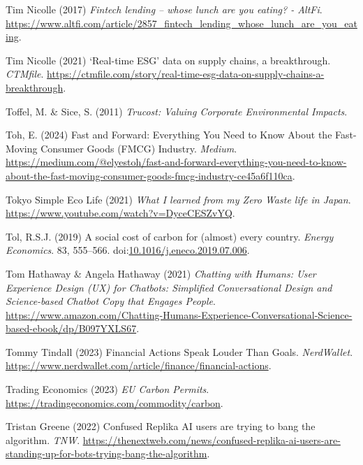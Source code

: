 \documentclass[
  letterpaper,
  DIV=11,
  numbers=noendperiod]{scrartcl}
\newlength{\cslhangindent}
\newenvironment{CSLReferences}[2] %
 {\begin{list}{}{%
  \setlength{\itemindent}{0pt}
  \setlength{\leftmargin}{0pt}
  \setlength{\parsep}{0pt}
  \ifodd #1
   \setlength{\leftmargin}{\cslhangindent}
   \setlength{\itemindent}{-1\cslhangindent}
  \fi
  \setlength{\itemsep}{#2\baselineskip}}}
 {\end{list}}
\begin{document}
\begin{CSLReferences}{0}{1}
Tim Nicolle (2017) \emph{Fintech lending -- whose lunch are you eating?
- {AltFi}}.
\url{https://www.altfi.com/article/2857_fintech_lending_whose_lunch_are_you_eating}.

Tim Nicolle (2021) {`{Real-time ESG}'} data on supply chains, a
breakthrough. \emph{CTMfile}.
\url{https://ctmfile.com/story/real-time-esg-data-on-supply-chains-a-breakthrough}.

Toffel, M. \& Sice, S. (2011) \emph{Trucost: {Valuing Corporate
Environmental Impacts}}.

Toh, E. (2024) Fast and {Forward}: {Everything You Need} to {Know About}
the {Fast-Moving Consumer Goods} ({FMCG}) {Industry}. \emph{Medium}.
\url{https://medium.com/@elyestoh/fast-and-forward-everything-you-need-to-know-about-the-fast-moving-consumer-goods-fmcg-industry-ce45a6f110ca}.

Tokyo Simple Eco Life (2021) \emph{What {I} learned from my {Zero Waste}
life in {Japan}}. \url{https://www.youtube.com/watch?v=DyceCESZvYQ}.

Tol, R.S.J. (2019) A social cost of carbon for (almost) every country.
\emph{Energy Economics}. 83, 555--566.
doi:\href{https://doi.org/10.1016/j.eneco.2019.07.006}{10.1016/j.eneco.2019.07.006}.

Tom Hathaway \& Angela Hathaway (2021) \emph{Chatting with {Humans}:
{User Experience Design} ({UX}) for {Chatbots}: {Simplified
Conversational Design} and {Science-based Chatbot Copy} that {Engages
People}}.
\url{https://www.amazon.com/Chatting-Humans-Experience-Conversational-Science-based-ebook/dp/B097YXLS67}.

Tommy Tindall (2023) Financial {Actions Speak Louder Than Goals}.
\emph{NerdWallet}.
\url{https://www.nerdwallet.com/article/finance/financial-actions}.

Trading Economics (2023) \emph{{EU Carbon Permits}}.
\url{https://tradingeconomics.com/commodity/carbon}.

Tristan Greene (2022) Confused {Replika AI} users are trying to bang the
algorithm. \emph{TNW}.
\url{https://thenextweb.com/news/confused-replika-ai-users-are-standing-up-for-bots-trying-bang-the-algorithm}.


\end{CSLReferences}
\end{document}

